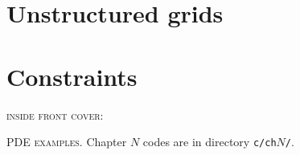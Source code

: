 \documentclass{tufte-book}
\newcommand{\CODELOC}{}  %
\newcommand{\stubinput}[2]{}
\newcommand{\stubinput}[2]{\vspace{5cm} \centerline{\LARGE Percent completed:  \Huge #2\%.} \vfill}
\theoremstyle{definition}
\begin{document}
\chapter{Unstructured grids}
\label{chap:dp}
\renewcommand{\CODELOC}{ch11/}
\stubinput{dmplex.tex}{0}

\chapter{Constraints}
\label{chap:co}
\renewcommand{\CODELOC}{ch12/}
\stubinput{constrained.tex}{20}


\backmatter




\clearpage

\newcommand{\tblockeqncode}[3]{
\begin{tabular}[t]{l} #1 \\ \quad {\normalsize \texttt{#3}} \\ \qquad \fbox{\small #2} \end{tabular}
}
\newcommand{\tblockcode}[2]{
\begin{tabular}[t]{l} #1 \\ \quad {\normalsize \texttt{#2}} \end{tabular}
}
\newcommand{\tblock}[1]{
\begin{tabular}[t]{l} #1 \end{tabular}
}

\clearpage
\thispagestyle{empty}
\noindent \textsc{inside front cover:}

\vfill
{\large \noindent \textsc{PDE examples}.} \quad Chapter $N$ codes are in directory \texttt{c/ch}$N$\texttt{/}.
\end{document}
